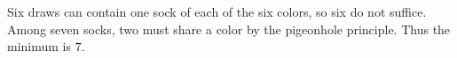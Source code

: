 Six draws can contain one sock of each of the six colors, so six do not suffice. Among seven socks, two must share a color by the pigeonhole principle. Thus the minimum is $\boxed{7}$.
